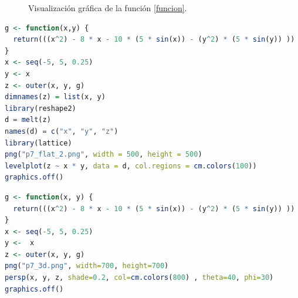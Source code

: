 \documentclass{article}
\begin{document}
\begin{figure}[h!]
\centering
{}
\caption{Visualizaci\'on gráfica de la funci\'on \eqref{funcion}.} 
\label{f1}
\end{figure}
\newpage

\begin{lstlisting}[language=R, caption= C\'odigo proyecci\'on del plano \texttt{xy}.]
g <- function(x,y) {
  return(((x^2) - 8 * x - 10 * (5 * sin(x)) - (y^2) * (5 * sin(y)) ))
}
x <- seq(-5, 5, 0.25) 
y <- x
z <- outer(x, y, g)
dimnames(z) = list(x, y)
library(reshape2)
d = melt(z)
names(d) = c("x", "y", "z")
library(lattice)
png("p7_flat_2.png", width = 500, height = 500)
levelplot(z ~ x * y, data = d, col.regions = cm.colors(100))
graphics.off()
\end{lstlisting}

\begin{lstlisting}[language=R, caption= C\'odigo gr\'afica 3D.]
g <- function(x, y) {
  return(((x^2) - 8 * x - 10 * (5 * sin(x)) - (y^2) * (5 * sin(y)) ))
}
x <- seq(-5, 5, 0.25)
y <-  x
z <- outer(x, y, g)
png("p7_3d.png", width=700, height=700)
persp(x, y, z, shade=0.2, col=cm.colors(800) , theta=40, phi=30)
graphics.off()
\end{lstlisting}
\end{document}
